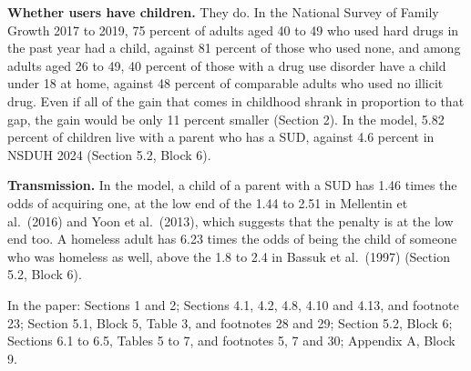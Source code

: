 \documentclass[11pt]{article}
\begin{document}
\begin{response}
\textbf{Whether users have children.} They do. In the National Survey of Family Growth
2017 to 2019, 75 percent of adults aged 40 to 49 who used hard drugs in the past year had a
child, against 81 percent of those who used none, and among adults aged 26 to 49, 40
percent of those with a drug use disorder have a child under 18 at home, against 48 percent
of comparable adults who used no illicit drug. Even if all of the gain that comes in
childhood shrank in proportion to that gap, the gain would be only 11 percent smaller
(Section 2). In the model, 5.82 percent of children live with a parent who has a SUD,
against 4.6 percent in NSDUH 2024 (Section 5.2, Block 6).

\textbf{Transmission.} In the model, a child of a parent with a SUD has 1.46 times the odds
of acquiring one, at the low end of the 1.44 to 2.51 in Mellentin et al.\ (2016) and Yoon
et al.\ (2013), which suggests that the penalty is at the low end too. A homeless adult has
6.23 times the odds of being the child of someone who was homeless as well, above the 1.8
to 2.4 in Bassuk et al.\ (1997) (Section 5.2, Block 6).

In the paper: Sections 1 and 2; Sections 4.1, 4.2, 4.8, 4.10 and 4.13, and footnote 23;
Section 5.1, Block 5, Table 3, and footnotes 28 and 29; Section 5.2, Block 6; Sections 6.1
to 6.5, Tables 5 to 7, and footnotes 5, 7 and 30; Appendix A, Block 9.
\end{response}
\end{document}
